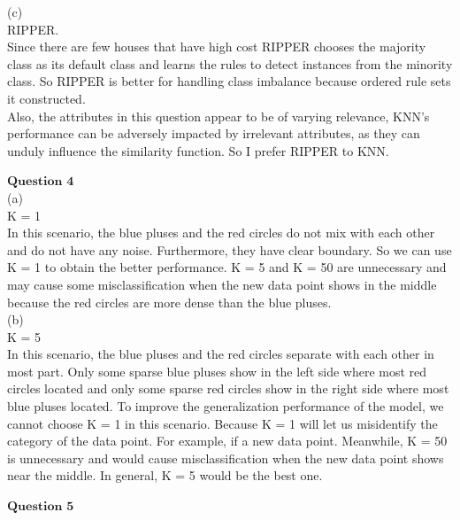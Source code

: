 \documentclass[12pt]{article}
\begin{document}
(c)\\

RIPPER.\\

Since there are few houses that have high cost RIPPER chooses the majority class as its default class and learns the rules to detect instances from the minority class. So RIPPER is better for handling class imbalance because ordered rule sets it constructed. \\

Also, the attributes in this question appear to be of varying relevance, KNN’s performance can be adversely impacted by irrelevant attributes, as they can unduly influence the similarity function. So I prefer RIPPER to KNN.\\

\newpage

$\textbf{Question 4}$\\

(a)\\

K = 1\\

In this scenario, the blue pluses and the red circles do not mix with each other and do not have any noise. Furthermore, they have clear boundary. So we can use K = 1 to obtain the better performance. K = 5 and K = 50 are unnecessary and may cause some misclassification when the new data point shows in the middle because the red circles are more dense than the blue pluses.\\

(b)\\

K = 5\\

In this scenario, the blue pluses and the red circles separate with each other in most part. Only some sparse blue pluses show in the left side where most red circles located and only some sparse red circles show in the right side where most blue pluses located. To improve the generalization performance of the model, we cannot choose K = 1 in this scenario. Because K = 1 will let us misidentify the category of the data point. For example, if a new data point. Meanwhile, K = 50 is unnecessary and would cause misclassification when the new data point shows near the middle. In general, K = 5 would be the best one.


\newpage

$\textbf{Question 5}$\\
\end{document}
